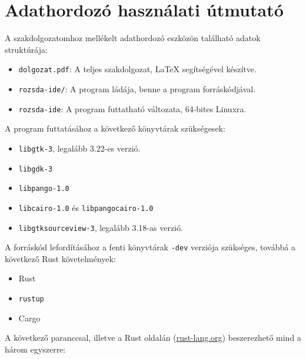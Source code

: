 \chapter*{Adathordozó használati útmutató}



\noindent A szakdolgozatomhoz mellékelt adathordozó eszközön található adatok struktúrája:

\begin{itemize}
    \item \texttt{dolgozat.pdf}: A teljes szakdolgozat, \LaTeX{} segítségével készítve.
    \item \texttt{rozsda-ide/}: A program ládája, benne a program forráskódjával.
    \item \texttt{rozsda-ide}: A program futtatható változata, 64-bites Linuxra.
\end{itemize}

\noindent A program futtatásához a következő könyvtárak szükségesek:

\begin{itemize}
    \item \texttt{libgtk-3}, legalább 3.22-es verzió.
    \item \texttt{libgdk-3}
    \item \texttt{libpango-1.0}
    \item \texttt{libcairo-1.0} és \texttt{libpangocairo-1.0}
    \item \texttt{libgtksourceview-3}, legalább 3.18-as verzió.
\end{itemize}

\noindent A forráskód lefordításához a fenti könyvtárak \texttt{-dev} verziója szükséges,
továbbá a következő Rust követelmények:

\begin{itemize}
    \item Rust
    \item \texttt{rustup}
    \item Cargo
\end{itemize}

\noindent A következő paranccsal, illetve a Rust oldalán (\url{rust-lang.org})
beszerezhető mind a három egyszerre: 